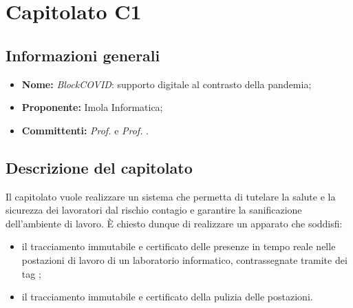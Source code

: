 \section{Capitolato C1}

\subsection{Informazioni generali}
\begin{itemize}
\item \textbf{Nome:} \textit{BlockCOVID}: supporto digitale al contrasto della pandemia;
\item \textbf{Proponente:} Imola Informatica;
\item \textbf{Committenti:} \textit{Prof. \Tullio{}} e \textit{Prof. \Riccardo{}}.
\end{itemize}

\subsection{Descrizione del capitolato}
Il capitolato vuole realizzare un sistema che permetta di tutelare la salute e la sicurezza dei lavoratori dal rischio contagio e garantire la sanificazione dell'ambiente di lavoro. È chiesto dunque di realizzare un apparato che soddisfi:
\begin{itemize}
\item il tracciamento immutabile e certificato delle presenze in tempo reale nelle postazioni di lavoro di un laboratorio informatico, contrassegnate tramite dei tag ;
\item il tracciamento immutabile e certificato della pulizia delle postazioni.
\end{itemize}
